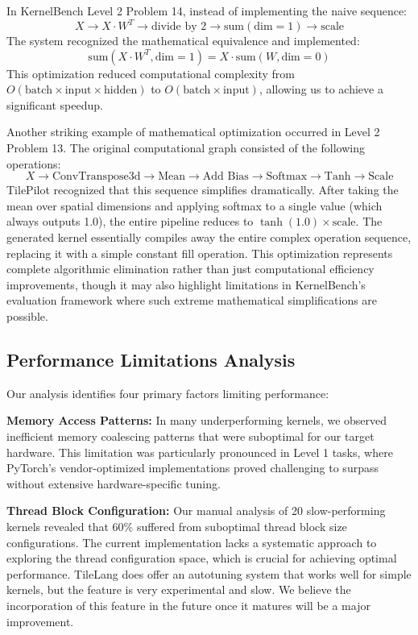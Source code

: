 \documentclass{article}
\begin{document}
In KernelBench Level 2 Problem 14, instead of implementing the naive sequence:
$$
X \rightarrow X \cdot W^T \rightarrow \text{divide by 2} \rightarrow \text{sum}(\text{dim}=1) \rightarrow \text{scale}
$$
The system recognized the mathematical equivalence and implemented:
$$
\text{sum}(X \cdot W^T, \text{dim}=1) = X \cdot \text{sum}(W, \text{dim}=0)
$$
This optimization reduced computational complexity from $O(\text{batch} \times \text{input} \times \text{hidden})$ to $O(\text{batch} \times \text{input})$, allowing us to achieve a significant speedup.

Another striking example of mathematical optimization occurred in Level 2 Problem 13. The original computational graph consisted of the following operations:
$$
X \rightarrow \text{ConvTranspose3d} \rightarrow \text{Mean} \rightarrow \text{Add Bias} \rightarrow \text{Softmax} \rightarrow \text{Tanh} \rightarrow \text{Scale}
$$
TilePilot recognized that this sequence simplifies dramatically. After taking the mean over spatial dimensions and applying softmax to a single value (which always outputs 1.0), the entire pipeline reduces to $\tanh(1.0) \times \text{scale}$. The generated kernel essentially compiles away the entire complex operation sequence, replacing it with a simple constant fill operation. This optimization represents complete algorithmic elimination rather than just computational efficiency improvements, though it may also highlight limitations in KernelBench's evaluation framework where such extreme mathematical simplifications are possible.

\subsection{Performance Limitations Analysis}

Our analysis identifies four primary factors limiting performance:

\textbf{Memory Access Patterns:} In many underperforming kernels, we observed inefficient memory coalescing patterns that were suboptimal for our target hardware. This limitation was particularly pronounced in Level 1 tasks, where PyTorch's vendor-optimized implementations proved challenging to surpass without extensive hardware-specific tuning.

\textbf{Thread Block Configuration:} Our manual analysis of 20 slow-performing kernels revealed that 60\% suffered from suboptimal thread block size configurations. The current implementation lacks a systematic approach to exploring the thread configuration space, which is crucial for achieving optimal performance. TileLang does offer an autotuning system that works well for simple kernels, but the feature is very experimental and slow. We believe the incorporation of this feature in the future once it matures will be a major improvement.
\end{document}
